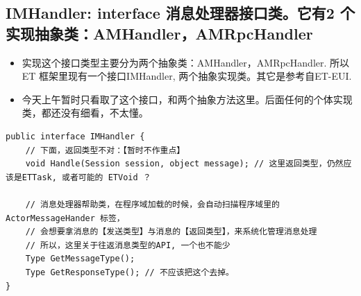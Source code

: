 \documentclass[9pt, b5paper]{article}
\begin{document}
\subsection{IMHandler: interface 消息处理器接口类。它有2 个实现抽象类：AMHandler，AMRpcHandler}
\label{sec-12-1}
\begin{itemize}
\item 实现这个接口类型主要分为两个抽象类：AMHandler，AMRpcHandler. 所以ET 框架里现有一个接口IMHandler, 两个抽象实现类。其它是参考自ET-EUI.
\item 今天上午暂时只看取了这个接口，和两个抽象方法这里。后面任何的个体实现类，都还没有细看，不太懂。
\end{itemize}
\begin{verbatim}
public interface IMHandler {
    // 下面，返回类型不对：【暂时不作重点】
    void Handle(Session session, object message); // 这里返回类型，仍然应该是ETTask, 或者可能的 ETVoid ？

    // 消息处理器帮助类，在程序域加载的时候，会自动扫描程序域里的ActorMessageHander 标签，
    // 会想要拿消息的【发送类型】与消息的【返回类型】，来系统化管理消息处理
    // 所以，这里关于往返消息类型的API, 一个也不能少
    Type GetMessageType();
    Type GetResponseType(); // 不应该把这个去掉。
}
\end{verbatim}
\end{document}
